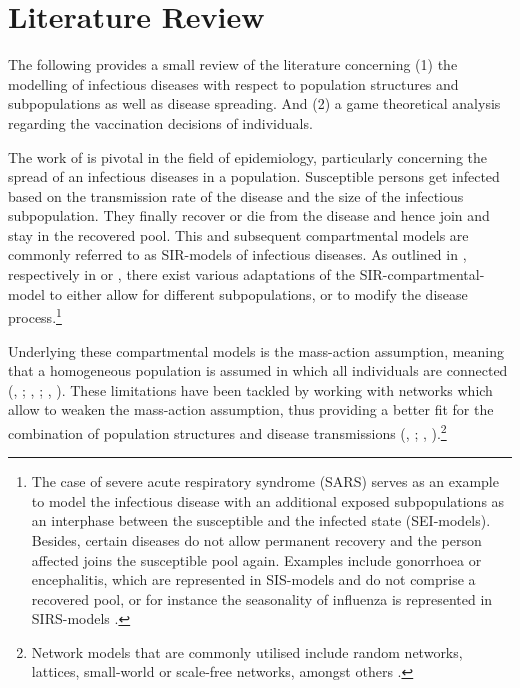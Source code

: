 \documentclass[11pt]{article}
\begin{document}
\section{Literature Review}
The following provides a small review of the literature concerning (1) the modelling of infectious diseases with respect to population structures and subpopulations as well as disease spreading. And (2) a game theoretical analysis regarding the vaccination decisions of individuals. 

The work of \cite{kermack1927} is pivotal in the field of epidemiology, particularly concerning the spread of an infectious diseases in a population. Susceptible persons get infected based on the transmission rate of the disease and the size of the infectious subpopulation. They finally recover or die from the disease and hence join and stay in the recovered pool. This and subsequent compartmental models are commonly referred to as SIR-models of infectious diseases. 
As outlined in \cite{earn2008}, respectively in \cite{dadlani2013} or \cite{sun2016}, there exist various adaptations of the SIR-compartmental-model to either allow for different subpopulations, or to modify the disease process.\footnote{The case of severe acute respiratory syndrome (SARS) serves as an example to model the infectious disease with an additional exposed subpopulations as an interphase between the susceptible and the infected state (SEI-models). Besides, certain diseases do not allow permanent recovery and the person affected joins the susceptible pool again. Examples include gonorrhoea or encephalitis, which are represented in SIS-models and do not comprise a recovered pool, or for instance the seasonality of influenza is represented in SIRS-models \citep{dadlani2013}.} 

Underlying these compartmental models is the mass-action assumption, meaning that a homogeneous population is assumed in which all individuals are connected (\citeauthor{heesterbeek2005}, \citeyear{heesterbeek2005}; \citeauthor{rusu2015}, \citeyear{rusu2015}; \citeauthor{wilson1945a}, \citeyear{wilson1945a}). These limitations have been tackled by working with networks which allow to weaken the mass-action assumption, thus providing a better fit for the combination of population structures and disease transmissions (\citeauthor{keeling2005}, \citeyear{keeling2005}; \citeauthor{meyers2005}, \citeyear{meyers2005}).\footnote{Network models that are commonly utilised include random networks, lattices, small-world or scale-free networks, amongst others \citep{keeling2005}.}    
\end{document}
